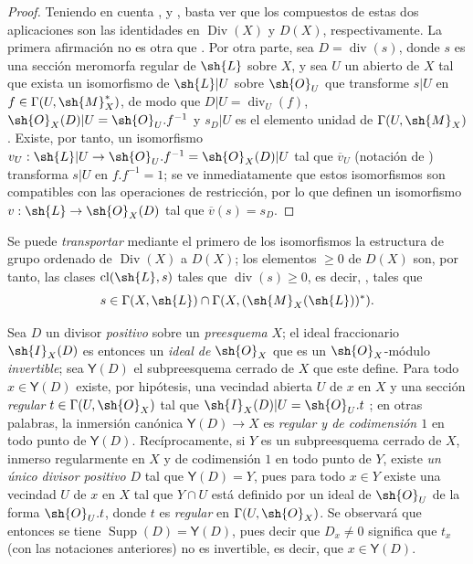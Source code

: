 \begin{proof}
Teniendo en cuenta ,  y , basta ver que los compuestos de estas dos aplicaciones son las identidades en $\operatorname{Div}(X)$ y $D(X)$, respectivamente.
La primera afirmación no es otra que .
Por otra parte, sea $D=\operatorname{div}(s)$, donde $s$ es una sección meromorfa regular de $\sh{L}$ sobre $X$, y sea $U$ un abierto de $X$ tal que exista un isomorfismo de $\sh{L}|U$ sobre $\sh{O}_U$ que transforme $s|U$ en $f\in\Gamma(U,\sh{M}_X^*)$, de modo que $D|U=\operatorname{div}_U(f)$, $\sh{O}_X(D)|U=\sh{O}_U.f^{-1}$ y $s_D|U$ es el elemento unidad de $\Gamma(U,\sh{M}_X)$.
Existe, por tanto, un isomorfismo $v_U:\sh{L}|U\to\sh{O}_U.f^{-1}=\sh{O}_X(D)|U$ tal que $\overline{v}_U$ (notación de ) transforma $s|U$ en $f.f^{-1}=1$;
se ve inmediatamente que estos isomorfismos son compatibles con las operaciones de restricción, por lo que definen un isomorfismo $v:\sh{L}\to\sh{O}_X(D)$ tal que $\overline{v}(s)=s_D$.
\end{proof}

Se puede \emph{transportar} mediante el primero de los isomorfismos  la estructura de grupo ordenado de $\operatorname{Div}(X)$ a $D(X)$;
los elementos $\geq0$ de $D(X)$ son, por tanto, las clases $\operatorname{cl}(\sh{L},s)$ tales que $\operatorname{div}(s)\geq0$, es decir, , tales que
\[
  s\in\Gamma(X,\sh{L})\cap\Gamma(X,(\sh{M}_X(\sh{L}))^*).
\]

\begin{env}[21.2.12]
\label{IV.21.2.12}
Sea $D$ un divisor \emph{positivo} sobre un \emph{preesquema} $X$;
el ideal fraccionario $\sh{I}_X(D)$ es entonces un \emph{ideal de} $\sh{O}_X$ que es un $\sh{O}_X$-módulo \emph{invertible};
sea $\boldsymbol{\mathsf{Y}}(D)$ el subpreesquema cerrado de $X$ que este define.
Para todo $x\in\boldsymbol{\mathsf{Y}}(D)$ existe, por hipótesis, una vecindad abierta $U$ de $x$ en $X$ y una sección \emph{regular} $t\in\Gamma(U,\sh{O}_X)$ tal que $\sh{I}_X(D)|U=\sh{O}_U.t$ ;
en otras palabras, la inmersión canónica $\boldsymbol{\mathsf{Y}}(D)\to X$ es \emph{regular y de codimensión $1$}  en todo punto de $\boldsymbol{\mathsf{Y}}(D)$.
Recíprocamente, si $Y$ es un subpreesquema cerrado de $X$, inmerso regularmente en $X$ y de codimensión $1$ en todo punto de $Y$, existe \emph{un único divisor positivo} $D$ tal que $\boldsymbol{\mathsf{Y}}(D)=Y$, pues para todo $x\in Y$ existe una vecindad $U$ de $x$ en $X$ tal que $Y\cap U$ está definido por un ideal de $\sh{O}_U$ de la forma $\sh{O}_U.t$, donde $t$ es \emph{regular} en $\Gamma(U,\sh{O}_X)$.
Se observará que entonces se tiene $\operatorname{Supp}(D)=\boldsymbol{\mathsf{Y}}(D)$, pues decir que $D_x\neq0$ significa que $t_x$ (con las notaciones anteriores) no es invertible, es decir, que $x\in\boldsymbol{\mathsf{Y}}(D)$.
\end{env}


